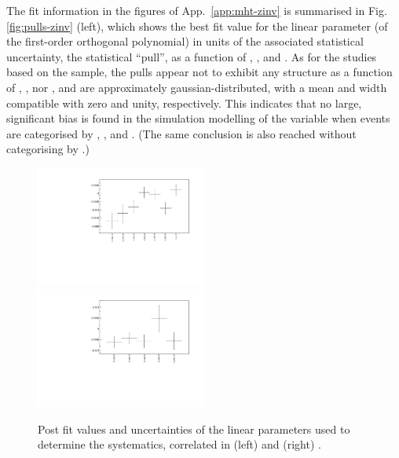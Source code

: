 The fit information in the figures of App.~\ref{app:mht-zinv} is
summarised in Fig.\ref{fig:pulls-zinv} (left), which shows the best fit
value for the linear parameter (of the first-order orthogonal
polynomial) in units of the
associated statistical uncertainty, \ie the statistical ``pull'', as a
function of \njet, \nb, and \scalht. As for the studies based on the
\mmj sample, the pulls appear not to exhibit any structure as a
function of \njet, \nb, nor \scalht, and are approximately
gaussian-distributed, with a mean and width compatible with zero and
unity, respectively. This indicates that no large, significant bias is
found in the simulation modelling of the \mht variable when events are
categorised by \njet, \scalht, and \nb. (The same conclusion is also
reached without categorising by \nb.)
\begin{figure}[h!]
  \centering
  \includegraphics[width=0.5\textwidth]{figures/mhtTemplate/exclusive_corr_njet/MuMu_graph}~
  \includegraphics[width=0.5\textwidth]{figures/mhtTemplate/exclusive_corr_ht/MuMu_graph}\\
  \caption{\label{fig:postFitMuMu} Post fit values and uncertainties of
    the linear parameters used to determine the systematics,
    correlated in (left) \njet and (right) \scalht.}
\end{figure}

